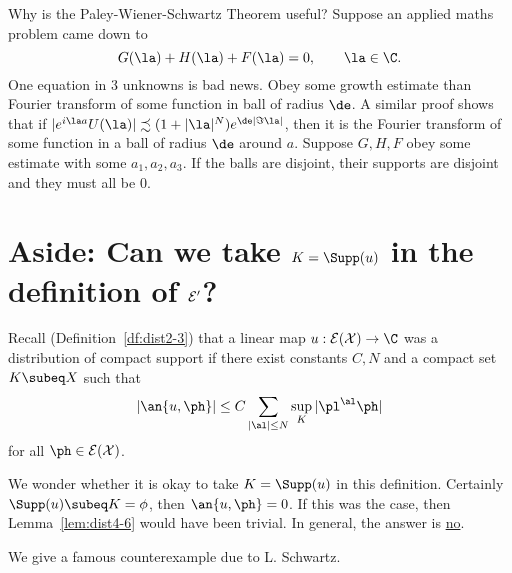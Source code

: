 
Why is the Paley-Wiener-Schwartz Theorem useful? Suppose an applied maths problem came down to
\[
G(\la)+H(\la)+F(\la)=0,\qquad \la\in \C.
\]
One equation in 3 unknowns is bad news. 
Obey some growth estimate than Fourier transform of some function in ball of radius $\de$. A similar proof shows that if $|e^{i\la a}U(\la)|\precsim (1+|\la|^N)e^{\de|\Im \la|}$, then it is the Fourier transform of some function in a ball of radius $\de$ around $a$.
Suppose $G, H, F$ obey some estimate with some $a_1,a_2,a_3$. If the balls are disjoint, their supports are disjoint and they must all be 0.


\section{Aside: Can we take $K=\Supp(u)$ in the definition of $\cal E'$?}

Recall (Definition~\ref{df:dist2-3}) that a linear map $u:\cal E(X)\to \C$ was a distribution of compact support if there exist constants $C,N$ and a compact set $K\subeq X$ such that 
\[
|\an{u,\ph}|\le C\sum_{|\al|\le N} \sup_K|\pl^{\al}\ph|
\]
for all $\ph\in \cal E(X)$.

We wonder whether it is okay to take $K=\Supp(u)$ in this definition. Certainly $\Supp(u)\subeq K=\phi$, then $\an{u,\ph}=0$. If this was the case, then Lemma~\ref{lem:dist4-6} would have been trivial. %
In general, the answer is \ul{no}.

We give a famous counterexample due to L. Schwartz. 

